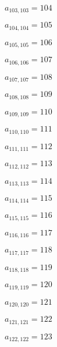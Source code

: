 \documentclass[a4paper,12pt]{article}
\begin{document}
$a _{ 103, 103 } = 104$

$a _{ 104, 104 } = 105$

$a _{ 105, 105 } = 106$

$a _{ 106, 106 } = 107$

$a _{ 107, 107 } = 108$

$a _{ 108, 108 } = 109$

$a _{ 109, 109 } = 110$

$a _{ 110, 110 } = 111$

$a _{ 111, 111 } = 112$

$a _{ 112, 112 } = 113$

$a _{ 113, 113 } = 114$

$a _{ 114, 114 } = 115$

$a _{ 115, 115 } = 116$

$a _{ 116, 116 } = 117$

$a _{ 117, 117 } = 118$

$a _{ 118, 118 } = 119$

$a _{ 119, 119 } = 120$

$a _{ 120, 120 } = 121$

$a _{ 121, 121 } = 122$

$a _{ 122, 122 } = 123$
\end{document}
